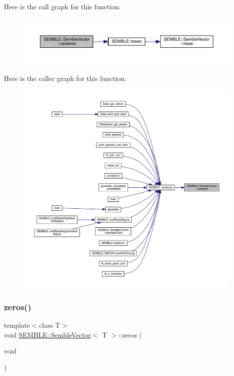 Here is the call graph for this function\+:
\nopagebreak
\begin{figure}[H]
\begin{center}
\leavevmode
\includegraphics[width=350pt]{d9/d94/structSEMBLE_1_1SembleVector_a105aedbde26eb3678ee4721e2e38ceda_cgraph}
\end{center}
\end{figure}
Here is the caller graph for this function\+:
\nopagebreak
\begin{figure}[H]
\begin{center}
\leavevmode
\includegraphics[width=350pt]{d9/d94/structSEMBLE_1_1SembleVector_a105aedbde26eb3678ee4721e2e38ceda_icgraph}
\end{center}
\end{figure}
\mbox{\label{structSEMBLE_1_1SembleVector_a17337e7001050f08298608379aa6504c}} 
\subsubsection{\texorpdfstring{zeros()}{zeros()}\hspace{0.1cm}{\footnotesize\ttfamily [1/2]}}
{\footnotesize\ttfamily template$<$class T$>$ \\
void \mbox{\hyperlink{structSEMBLE_1_1SembleVector}{S\+E\+M\+B\+L\+E\+::\+Semble\+Vector}}$<$ T $>$\+::zeros (\begin{DoxyParamCaption}\item[{void}]{ }\end{DoxyParamCaption})}

